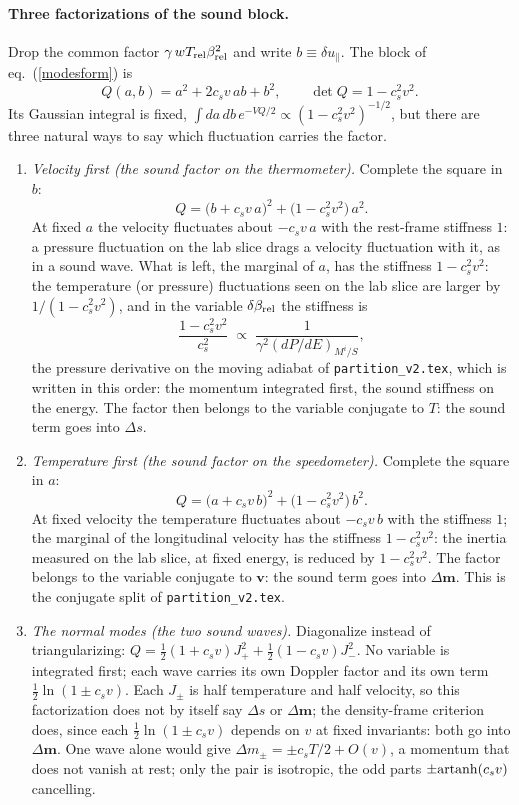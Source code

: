\documentclass[11pt,aps,preprint,nofootinbib,superscriptaddress,tightenlines]{revtex4-2}
\def\st{\begin{equation}}
\def\stp{\end{equation}}
\def\Eq#1{eq.~(\ref{#1})}
\let\oldparagraph\paragraph
\renewcommand{\paragraph}{\par\bigskip\oldparagraph}
\begin{document}
\paragraph{Three factorizations of the sound block.}  Drop the common factor $\gamma\,wT_{\rm rel}\beta_{\rm rel}^2$ and write $b\equiv\delta u_\parallel$.  The block of
\Eq{modesform} is
\st
Q(a,b)=a^2+2c_sv\,ab+b^2 ,\qquad \det Q=1-c_s^2v^2 .
\stp
Its Gaussian integral is fixed, $\int da\,db\,e^{-VQ/2}\propto(1-c_s^2v^2)^{-1/2}$, but there are three natural ways to say which fluctuation carries the factor.
\begin{enumerate}
\item \emph{Velocity first (the sound factor on the thermometer).}  Complete the square in $b$:
  \st
  Q=\big(b+c_sv\,a\big)^2+\big(1-c_s^2v^2\big)\,a^2 .
  \stp
  At fixed $a$ the velocity fluctuates about $-c_sv\,a$ with the rest-frame stiffness $1$: a pressure fluctuation on the lab slice drags a velocity fluctuation with it,
  as in a sound wave.  What is left, the marginal of $a$, has the stiffness $1-c_s^2v^2$: the temperature (or pressure) fluctuations seen on the lab slice are larger by
  $1/(1-c_s^2v^2)$, and in the variable $\delta\beta_{\rm rel}$ the stiffness is
  \st
  \frac{1-c_s^2v^2}{c_s^2}\;\propto\;\frac1{\gamma^2(dP/dE)_{M^i/S}} ,
  \stp
  the pressure derivative on the moving adiabat of \nolinkurl{partition_v2.tex}, which is written in this order: the momentum integrated first, the sound stiffness on the
  energy.  The factor then belongs to the variable conjugate to $T$: the sound term goes into $\Delta s$.
\item \emph{Temperature first (the sound factor on the speedometer).}  Complete the square in $a$:
  \st
  Q=\big(a+c_sv\,b\big)^2+\big(1-c_s^2v^2\big)\,b^2 .
  \stp
  At fixed velocity the temperature fluctuates about $-c_sv\,b$ with the stiffness $1$; the marginal of the longitudinal velocity has the stiffness $1-c_s^2v^2$: the
  inertia measured on the lab slice, at fixed energy, is reduced by $1-c_s^2v^2$.  The factor belongs to the variable conjugate to $\bm v$: the sound term goes into $\Delta\bm m$.
  This is the conjugate split of \nolinkurl{partition_v2.tex}.
\item \emph{The normal modes (the two sound waves).}  Diagonalize instead of triangularizing: $Q=\tfrac12(1+c_sv)J_+^2+\tfrac12(1-c_sv)J_-^2$.  No variable is integrated first;
  each wave carries its own Doppler factor and its own term $\tfrac12\ln(1\pm c_sv)$.  Each $J_\pm$ is half temperature and half velocity, so this factorization does not by
  itself say $\Delta s$ or $\Delta\bm m$; the density-frame criterion does, since each $\tfrac12\ln(1\pm c_sv)$ depends on $v$ at fixed invariants: both go into $\Delta\bm m$.  One
  wave alone would give $\Delta m_\pm=\pm c_sT/2+O(v)$, a momentum that does not vanish at rest; only the pair is isotropic, the odd parts $\pm{\rm artanh}(c_sv)$ cancelling.
\end{enumerate}
\end{document}
